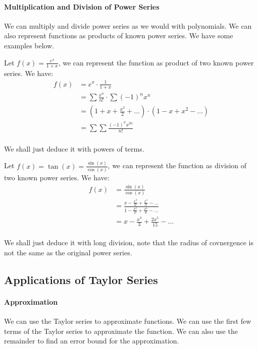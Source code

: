 \documentclass[11pt]{report}
\begin{document}
\paragraph{Multiplication and Division of Power Series} We can multiply and divide power series as we would with polynomials. We can also represent functions as products of known power series. We have some examples below.
\begin{example}
    Let $f(x) = \frac{e^x}{1+x}$, we can represent the function as product of two known power series. We have:
    \begin{align*}
        f(x) &= e^x \cdot \frac{1}{1+x} \\
        &= \sum \frac{x^n}{n!} \cdot \sum (-1)^n x^n \\
        &= (1 + x + \frac{x^2}{2} + \ldots) \cdot (1 - x + x^2 - \ldots) \\
        &= \sum \sum \frac{(-1)^n x^{2n}}{n!}
    \end{align*}
\end{example}
\paragraph{} We shall just deduce it with powers of terms.
\begin{example}
    Let $f(x) = \tan(x) = \frac{\sin(x)}{\cos(x)}$, we can represent the function as division of two known power series. We have:
    \begin{align*}
        f(x) &= \frac{\sin(x)}{\cos(x)} \\
        &= \frac{x - \frac{x^3}{3!} + \frac{x^5}{5!} - \ldots}{1 - \frac{x^2}{2!} + \frac{x^4}{4!} - \ldots} \\
        &= x - \frac{x^3}{3} + \frac{2x^5}{15} - \ldots
    \end{align*}
\end{example}
\paragraph{} We shall just deduce it with long division, note that the radius of covnergence is not the same as the original power series.
\subsection{Applications of Taylor Series}
\paragraph{Approximation} We can use the Taylor series to approximate functions. We can use the first few terms of the Taylor series to approximate the function. We can also use the remainder to find an error bound for the approximation.
\end{document}

